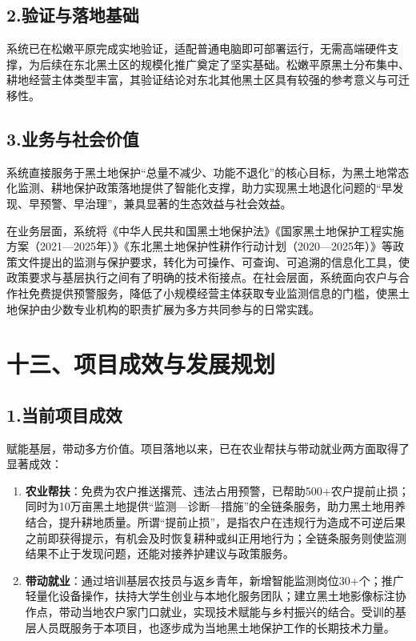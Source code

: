 \subsection{2.验证与落地基础}

系统已在松嫩平原完成实地验证，适配普通电脑即可部署运行，无需高端硬件支撑，为后续在东北黑土区的规模化推广奠定了坚实基础。松嫩平原黑土分布集中、耕地经营主体类型丰富，其验证结论对东北其他黑土区具有较强的参考意义与可迁移性。

\subsection{3.业务与社会价值}

系统直接服务于黑土地保护“总量不减少、功能不退化”的核心目标，为黑土地常态化监测、耕地保护政策落地提供了智能化支撑，助力实现黑土地退化问题的“早发现、早预警、早治理”，兼具显著的生态效益与社会效益。

在业务层面，系统将《中华人民共和国黑土地保护法》《国家黑土地保护工程实施方案（2021—2025年）》《东北黑土地保护性耕作行动计划（2020—2025年）》等政策文件提出的监测与保护要求，转化为可操作、可查询、可追溯的信息化工具，使政策要求与基层执行之间有了明确的技术衔接点。在社会层面，系统面向农户与合作社免费提供预警服务，降低了小规模经营主体获取专业监测信息的门槛，使黑土地保护由少数专业机构的职责扩展为多方共同参与的日常实践。

\section{十三、项目成效与发展规划}

\subsection{1.当前项目成效}

赋能基层，带动多方价值。项目落地以来，已在农业帮扶与带动就业两方面取得了显著成效：

\begin{enumerate}
  \item \textbf{农业帮扶}：免费为农户推送撂荒、违法占用预警，已帮助500+农户提前止损；同时为10万亩黑土地提供“监测—诊断—措施”的全链条服务，助力黑土地用养结合，提升耕地质量。所谓“提前止损”，是指农户在违规行为造成不可逆后果之前即获得提示，有机会及时恢复耕种或纠正用地行为；全链条服务则使监测结果不止于发现问题，还能对接养护建议与政策服务。
  \item \textbf{带动就业}：通过培训基层农技员与返乡青年，新增智能监测岗位30+个；推广轻量化设备操作，扶持大学生创业与本地化服务团队；建立黑土地影像标注协作点，带动当地农户家门口就业，实现技术赋能与乡村振兴的结合。受训的基层人员既服务于本项目，也逐步成为当地黑土地保护工作的长期技术力量。
\end{enumerate}

